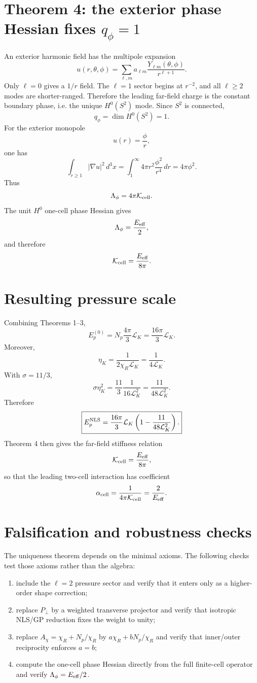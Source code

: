\documentclass[11pt]{article}
\newcommand{\LK}{\mathcal L_K}
\newcommand{\Kcell}{\mathcal K_{\rm cell}}
\newcommand{\Eeff}{E_{\rm eff}}
\newcommand{\EpNLS}{E_p^{\rm NLS}}
\newcommand{\alphacell}{\alpha_{\rm cell}}
\begin{document}
\section{Theorem 4: the exterior phase Hessian fixes \(q_\phi=1\)}

An exterior harmonic field has the multipole expansion
\[
  u(r,\theta,\phi)
  =
  \sum_{\ell,m}
  a_{\ell m}
  \frac{Y_{\ell m}(\theta,\phi)}{r^{\ell+1}}.
\]
Only \(\ell=0\) gives a \(1/r\) field.  The \(\ell=1\) sector begins at
\(r^{-2}\), and all \(\ell\ge2\) modes are shorter-ranged.  Therefore the
leading far-field charge is the constant boundary phase, i.e. the unique
\(H^0(S^2)\) mode.  Since \(S^2\) is connected,
\[
  q_\phi=\dim H^0(S^2)=1.
\]
For the exterior monopole
\[
  u(r)=\frac{\phi}{r},
\]
one has
\[
  \int_{r\ge1}
  |\nabla u|^2\,d^3x
  =
  \int_1^\infty
  4\pi r^2\frac{\phi^2}{r^4}\,dr
  =
  4\pi\phi^2.
\]
Thus
\[
  \Lambda_\phi=4\pi\Kcell.
\]
The unit \(H^0\) one-cell phase Hessian gives
\[
  \Lambda_\phi=\frac{\Eeff}{2},
\]
and therefore
\[
  \Kcell
  =
  \frac{\Eeff}{8\pi}.
\]

\section{Resulting pressure scale}

Combining Theorems 1--3,
\[
  E_p^{(0)}
  =
  N_p\frac{4\pi}{3}\LK
  =
  \frac{16\pi}{3}\LK.
\]
Moreover,
\[
  \eta_K
  =
  \frac{1}{2\chi_R\LK}
  =
  \frac{1}{4\LK}.
\]
With \(\sigma=11/3\),
\[
  \sigma\eta_K^2
  =
  \frac{11}{3}\frac{1}{16\LK^2}
  =
  \frac{11}{48\LK^2}.
\]
Therefore
\[
  \boxed{
  \EpNLS
  =
  \frac{16\pi}{3}\LK
  \left(
  1-\frac{11}{48\LK^2}
  \right).
  }
\]
Theorem 4 then gives the far-field stiffness relation
\[
  \Kcell=\frac{\Eeff}{8\pi},
\]
so that the leading two-cell interaction has coefficient
\[
  \alphacell
  =
  \frac{1}{4\pi\Kcell}
  =
  \frac{2}{\Eeff}.
\]

\section{Falsification and robustness checks}

The uniqueness theorem depends on the minimal axioms.  The following checks
test those axioms rather than the algebra:
\begin{enumerate}
\item include the \(\ell=2\) pressure sector and verify that it enters only as a
higher-order shape correction;
\item replace \(P_\perp\) by a weighted transverse projector and verify that
isotropic NLS/GP reduction fixes the weight to unity;
\item replace \(A_\chi=\chi_R+N_p/\chi_R\) by
\(a\chi_R+bN_p/\chi_R\) and verify that inner/outer reciprocity enforces
\(a=b\);
\item compute the one-cell phase Hessian directly from the full finite-cell
operator and verify \(\Lambda_\phi=\Eeff/2\).
\end{enumerate}
\end{document}
